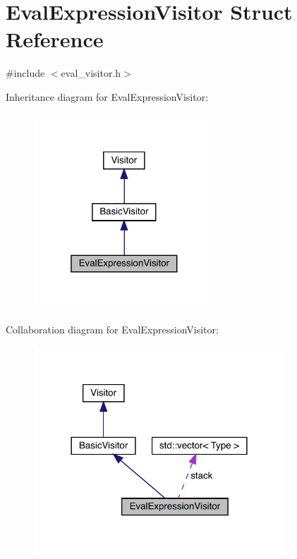 \hypertarget{struct_eval_expression_visitor}{}\section{Eval\+Expression\+Visitor Struct Reference}
\label{struct_eval_expression_visitor}


{\ttfamily \#include $<$eval\+\_\+visitor.\+h$>$}



Inheritance diagram for Eval\+Expression\+Visitor\+:
\nopagebreak
\begin{figure}[H]
\begin{center}
\leavevmode
\includegraphics[width=193pt]{struct_eval_expression_visitor__inherit__graph}
\end{center}
\end{figure}


Collaboration diagram for Eval\+Expression\+Visitor\+:
\nopagebreak
\begin{figure}[H]
\begin{center}
\leavevmode
\includegraphics[width=266pt]{struct_eval_expression_visitor__coll__graph}
\end{center}
\end{figure}
